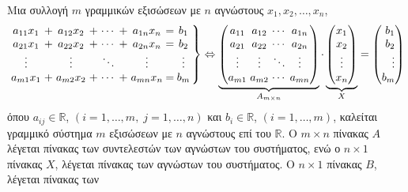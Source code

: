 \begin{dfn}
  Μια συλλογή $ m $ γραμμικών εξισώσεων με $n$ αγνώστους 
  $ x_{1}, x_{2}, \ldots, x_{n} $, 
  \begin{equation*}
    \setlength\arraycolsep{1.5pt} 
    \left.
      \begin{array}{ccc ccc c @{\extracolsep{2.5pt}}c
        @{\extracolsep{2.5pt}}c}
        a_{11}x_{1} & + & a_{12}x_{2} & + & \cdots & + & a_{1n}x_{n} & =
                    & b_{1} \\
        a_{21}x_{1} & + & a_{22}x_{2} & + & \cdots & + & a_{2n}x_{n} & =
                    & b_{2} \\
        \vdots & & \vdots & & \ddots & &  \vdots & &  \vdots \\
        a_{m1}x_{1} & + & a_{m2}x_{2} & + & \cdots & + & a_{mn}x_{n} & =
                    & b_{m} \\
      \end{array}
    \right\} \Leftrightarrow
    \underbrace{\begin{pmatrix}
        a_{11} & a_{12} & \cdots & a_{1n} \\
        a_{21} & a_{22} & \cdots & a_{2n} \\
        \vdots & \vdots & \ddots & \vdots \\
        a_{m1} & a_{m2} & \cdots & a_{mn} 
    \end{pmatrix}}_{A_{m \times n}}
    \cdot 
    \underbrace{\begin{pmatrix*}
        x_{1} \\
        x_{2} \\
        \vdots \\
        x_{n}
    \end{pmatrix*}}_{X} = 
    \begin{pmatrix*}[r]
      b_{1} \\
      b_{2} \\
      \vdots \\
      b_{m}
    \end{pmatrix*}
  \end{equation*}
  όπου $ a_{ij} \in \mathbb{R} $, $(i=1,\ldots,m, \; j=1,\ldots,n) $ και $ b_{i} \in
  \mathbb{R}$, $ (i=1,\ldots, m) $, καλείται \textcolor{Col1}{γραμμικό σύστημα} $ m $ 
  εξισώσεων με $n$ αγνώστους επί του $ \mathbb{R} $. Ο $ m \times n $ πίνακας $ A
  $ λέγεται \textcolor{Col1}{πίνακας των συντελεστών} των αγνώστων του συστήματος, 
  ενώ ο $ n \times 1 $ πίνακας $ X $, λέγεται \textcolor{Col1}{πίνακας των αγνώστων} του 
  συστήματος. Ο $ n \times 1 $ πίνακας $ B $, λέγεται \textcolor{Col1}{πίνακας των
}
\end{dfn}
